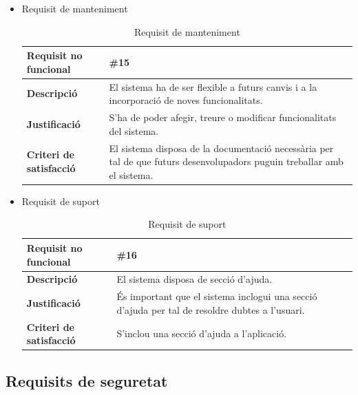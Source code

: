 \begin{itemize}
\item{Requisit de manteniment}

\begin{table}[!h]
\begin{tabular}{|l|M|}
\hline
\textbf{Requisit no funcional }& \#15  \\ \hline
\textbf{Descripció} & El sistema ha de ser flexible a futurs canvis i a la incorporació de noves funcionalitats.\\ \hline
\textbf{Justificació} & S’ha de poder afegir, treure o modificar funcionalitats
del sistema. \\ \hline
\textbf{Criteri de satisfacció} & El sistema disposa de la documentació necessària per tal de que futurs desenvolupadors puguin treballar amb el sistema.\\ \hline
\end{tabular}
\label{}
\caption{Requisit de manteniment}
\end{table}

\item{Requisit de suport}

\begin{table}[!h]
\begin{tabular}{|l|M|}
\hline
\textbf{Requisit no funcional }& \#16  \\ \hline
\textbf{Descripció} & El sistema disposa de secció d’ajuda.\\ \hline
\textbf{Justificació} & És important que el sistema inclogui una secció d’ajuda per tal de resoldre dubtes a l’usuari. \\ \hline
\textbf{Criteri de satisfacció} & S’inclou una secció d’ajuda a l’aplicació.\\ \hline
\end{tabular}
\label{}
\caption{Requisit de suport}
\end{table}

\end{itemize}

\subsection{Requisits de seguretat}

